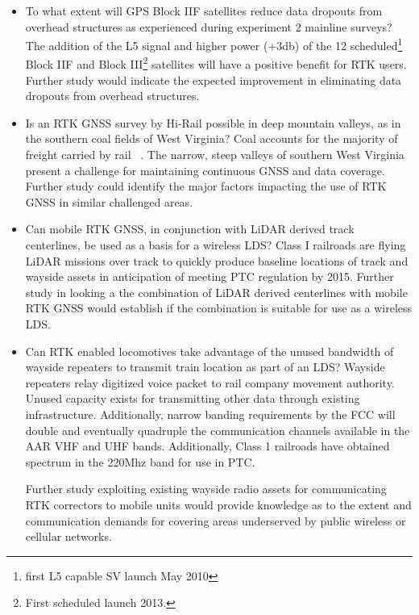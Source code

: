 \begin{itemize}
\item
To what extent will GPS Block IIF satellites reduce data dropouts from overhead structures as experienced during experiment 2 mainline surveys? The addition of the L5 signal and higher power (+3db) of the 12 scheduled\footnote{first L5 capable SV launch May 2010} Block IIF and Block III\footnote{First scheduled launch 2013.} satellites will have a positive benefit for RTK users. Further study would indicate the expected improvement in eliminating data dropouts from overhead structures.

\item
Is an RTK GNSS survey by Hi-Rail possible in deep mountain valleys, as in the southern coal fields of West Virginia? Coal accounts for the majority of freight carried by rail ~\citep{RITAtransStats08}. The narrow, steep valleys of southern West Virginia present a challenge for maintaining continuous GNSS and data coverage. Further study could identify the major factors impacting the use of RTK GNSS in similar challenged areas.


\item
Can mobile RTK GNSS, in conjunction with LiDAR derived track centerlines, be used as a basis for a wireless LDS? Class I railroads are flying LiDAR missions over track to quickly produce baseline locations of track and wayside assets in anticipation of meeting PTC regulation by 2015. Further study in looking a the combination of LiDAR derived centerlines with mobile RTK GNSS would establish if the combination is suitable for use as a wireless LDS.

\item
Can RTK enabled locomotives take advantage of the unused bandwidth of wayside repeaters to transmit train location as part of an LDS? Wayside repeaters relay digitized voice packet to rail company movement authority. Unused capacity exists for transmitting other data through existing infrastructure. Additionally, narrow banding requirements by the FCC will double and eventually quadruple the communication channels available in the AAR VHF and UHF bands. Additionally, Class 1 railroads have obtained spectrum in the 220Mhz band for use in PTC.

Further study exploiting existing wayside radio assets for communicating RTK correctors to mobile units would provide knowledge as to the extent and communication demands for covering areas underserved by public wireless or cellular networks.


\end{itemize}
